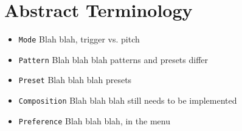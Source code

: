 \section{Abstract Terminology}
\begin{itemize}

  \item \texttt{Mode} Blah blah, trigger vs. pitch
  \item \texttt{Pattern} Blah blah blah patterns and presets differ
  \item \texttt{Preset} Blah blah blah presets
  \item \texttt{Composition} Blah blah blah still needs to be implemented
  \item \texttt{Preference} Blah blah blah, in the menu


\end{itemize}

%

